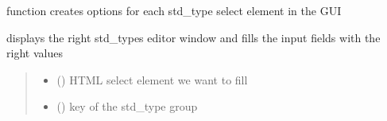 \documentclass[letterpaper,10pt,english]{sphinxmanual}
\begin{document}
\begin{fulllineitems}
\label{\detokenize{docs_gui/js_api/network_editor/display_editable_network_features:fillStdTypeList}}
\pysigstartsignatures
{}
\pysigstopsignatures
\sphinxAtStartPar
function creates options for each std\_type select element in the GUI

\end{fulllineitems}


\begin{fulllineitems}
\label{\detokenize{docs_gui/js_api/network_editor/display_editable_network_features:fillStdTypeEditor}}
\pysigstartsignatures
{}
\pysigstopsignatures
\sphinxAtStartPar
displays the right std\_types editor window and fills the input fields with the right values
\begin{quote}\begin{description}
\begin{itemize}
\item {} 
\sphinxAtStartPar
{} () \textendash{} HTML select element we want to fill

\item {} 
\sphinxAtStartPar
{} () \textendash{} key of the std\_type group

\end{itemize}

\end{description}\end{quote}

\end{fulllineitems}

\end{document}
